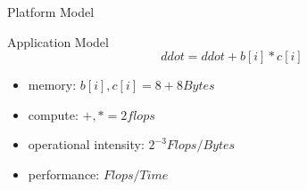 \begin{nframe}{Platform Model}
\begin{minipage}{.5\textwidth}
\begin{figure}
  \end{figure}
  \end{minipage}
\end{nframe}


\begin{nframe}{Application Model}
  \vspace{1cm}
  \begin{equation}
    ddot = ddot + b[i] * c[i]
  \end{equation}

  \vspace{1cm}

  \begin{itemize}
  \item memory: ${b[i], c[i]} = 8+8 Bytes$
  \item compute: ${+,*} = 2 flops$
  \item operational intensity: $2^{-3} Flops/Bytes$
  \item performance: $Flops/Time$
  \end{itemize}
\end{nframe}


